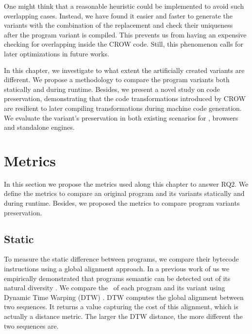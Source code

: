 One might think that a reasonable heuristic could be implemented to avoid such overlapping cases. Instead, we have found it easier and faster to generate the variants with the combination of the replacement and check their uniqueness after the program variant is compiled. This prevents us from having an expensive checking for overlapping inside the CROW code. Still, this phenomenon calls for later optimizations in future works.




In this chapter, we investigate to what extent the artificially created variants are different. We propose a methodology to compare the program variants both statically and during runtime. Besides, we present a novel study on code preservation, demonstrating that the code transformations introduced by CROW are resilient to later compiling transformations during machine code generation. We evaluate the variant's preservation in both existing scenarios for \wasm, browsers and standalone engines.

\section{Metrics}

In this section we propose the metrics used along this chapter to answer RQ2. We define the metrics to compare an original program and its variants statically and during runtime. Besides, we proposed the metrics to compare program variants preservation.

\subsection{Static}

To measure the static difference between programs, we compare their bytecode instructions using a global alignment approach. In a previous work of us we empirically demonstrated that programs semantic can be detected out of its natural diversity \citationneeded. We compare the \wasm\ of each program and its variant using Dynamic Time Warping (DTW) \cite{Maia08usinga}. DTW computes the global alignment between two sequences. It returns a value capturing the cost of this alignment, which is actually a distance metric. The larger the DTW distance, the more different the two sequences are.


